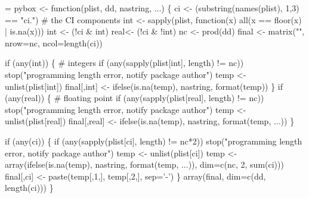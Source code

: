 \documentclass{article}
\begin{document}
\begin{nwchunk}
=
 pybox <- function(plist, dd, nastring, ...) \{
     ci <- (substring(names(plist), 1,3) == "ci.")  # the CI components
     int <- sapply(plist, function(x) all(x == floor(x) | is.na(x)))
     int <- (!ci & int)
     real<- (!ci & !int)
     nc <- prod(dd)
     final <- matrix("", nrow=nc, ncol=length(ci))
     
     if (any(int)) \{ # integers
         if (any(sapply(plist[int], length) != nc))
             stop("programming length error, notify package author")
         temp <- unlist(plist[int])
         final[,int] <- ifelse(is.na(temp), nastring, format(temp))
     \}
     if (any(real)) \{ # floating point
         if (any(sapply(plist[real], length) != nc))
             stop("programming length error, notify package author")
         temp <- unlist(plist[real])
         final[,real] <- ifelse(is.na(temp), nastring, 
                                format(temp,  ...))
     \}
     
     if (any(ci)) \{
         if (any(sapply(plist[ci], length) != nc*2))
             stop("programming length error, notify package author")
         temp <- unlist(plist[ci])    
         temp <- array(ifelse(is.na(temp), nastring,
                              format(temp,  ...)),
                       dim=c(nc, 2, sum(ci)))
         final[,ci] <- paste(temp[,1,], temp[,2,], sep='-')
     \}
     array(final, dim=c(dd, length(ci)))
 \}
\end{nwchunk}
\end{document}
